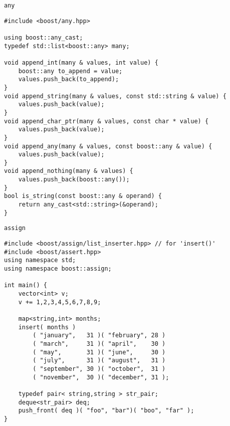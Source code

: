 \documentclass{beamer}
\begin{document}
\begin{frame}[fragile]{{\tt any}}
\small
\begin{lstlisting}
#include <boost/any.hpp>

using boost::any_cast;
typedef std::list<boost::any> many;

void append_int(many & values, int value) {
    boost::any to_append = value;
    values.push_back(to_append);
}
void append_string(many & values, const std::string & value) {
    values.push_back(value);
}
void append_char_ptr(many & values, const char * value) {
    values.push_back(value);
}
void append_any(many & values, const boost::any & value) {
    values.push_back(value);
}
void append_nothing(many & values) {
    values.push_back(boost::any());
}
bool is_string(const boost::any & operand) {
    return any_cast<std::string>(&operand);
}
\end{lstlisting}
\end{frame}

\begin{frame}[fragile]{{\tt assign}}
\small
\begin{lstlisting}
#include <boost/assign/list_inserter.hpp> // for 'insert()'
#include <boost/assert.hpp> 
using namespace std;
using namespace boost::assign;

int main() {
    vector<int> v; 
    v += 1,2,3,4,5,6,7,8,9;

    map<string,int> months;  
    insert( months )
        ( "january",   31 )( "february", 28 )
        ( "march",     31 )( "april",    30 )
        ( "may",       31 )( "june",     30 )
        ( "july",      31 )( "august",   31 )
        ( "september", 30 )( "october",  31 )
        ( "november",  30 )( "december", 31 );

    typedef pair< string,string > str_pair;
    deque<str_pair> deq;
    push_front( deq )( "foo", "bar")( "boo", "far" ); 
}
\end{lstlisting}
\end{frame}
\end{document}
